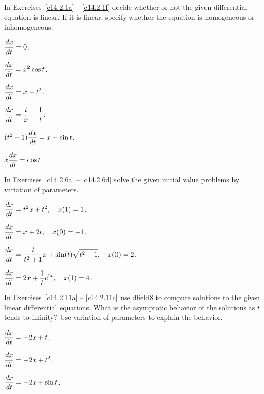 \documentclass{ximera}
\begin{document}
\noindent In Exercises~\ref{c14.2.1a} -- \ref{c14.2.1f} decide whether 
or not the given differential equation is linear.  If it is linear, 
specify whether the equation is homogeneous or inhomogeneous.
\begin{exercise}  \label{c14.2.1a}
$\displaystyle \frac{dx}{dt} = 0$.
\end{exercise}
\begin{exercise}  \label{c14.2.1b}
$\displaystyle \frac{dx}{dt} = x^2\cos t$.
\end{exercise}
\begin{exercise}  \label{c14.2.1c}
$\displaystyle \frac{dx}{dt} = x+t^2$.
\end{exercise}
\begin{exercise}  \label{c14.2.1d}
$\displaystyle \frac{dx}{dt} = \frac{t}{x}-\frac{1}{t}$.
\end{exercise}
\begin{exercise}  \label{c14.2.1e}
$\displaystyle (t^2+1)\frac{dx}{dt} = x+\sin t$.
\end{exercise}
\begin{exercise} \label{c14.2.1f}
$\displaystyle x\frac{dx}{dt} = \cos t$
\end{exercise}

\noindent In Exercises~\ref{c14.2.6a} -- \ref{c14.2.6d} solve the given 
initial value problems by variation of parameters.
\begin{exercise}   \label{c14.2.6a}
$\displaystyle \frac{dx}{dt} = t^2 x + t^2, \quad x(1)=1$.
\end{exercise}
\begin{exercise}   \label{c14.2.6b}
$\displaystyle \frac{dx}{dt} = x+2t, \quad x(0)=-1$.
\end{exercise}
\begin{exercise}   \label{c14.2.6c}
$\displaystyle \frac{dx}{dt} = 
\frac{t}{t^2+1}x+\sin(t)\sqrt{t^2+1},\quad x(0)=2$.
\end{exercise}
\begin{exercise}   \label{c14.2.6d}
$\displaystyle \frac{dx}{dt} = 2x+\frac{1}{t}e^{2t}, \quad x(1)=4$.
\end{exercise}



\CEXER

\noindent In Exercises~\ref{c14.2.11a} -- \ref{c14.2.11c} use 
{\sf dfield8} 
to compute solutions to the given linear differential equations.  What is 
the asymptotic behavior of the solutions as $t$ tends to infinity?  Use 
variation of parameters to explain the behavior.
\begin{exercise}   \label{c14.2.11a}
$\displaystyle\frac{dx}{dt} = -2 x + t$.
\end{exercise}
\begin{exercise}   \label{c14.2.11b}
$\displaystyle\frac{dx}{dt} = -2 x + t^2$.
\end{exercise}
\begin{exercise}   \label{c14.2.11c}
$\displaystyle\frac{dx}{dt} = -2 x + \sin t$.
\end{exercise}
\end{document}
